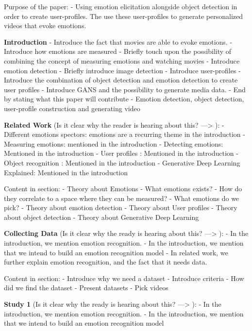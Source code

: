 Purpose of the paper:
    - Using emotion elicitation alongside object detection in order to create user-profiles. The use these user-profiles to generate personalized videos that evoke emotions. 

\textbf{Introduction}
 - Introduce the fact that movies are able to evoke emotions.
 - Introduce how emotions are measured
 - Briefly touch upon the possibility of combining the concept of measuring emotions and watching movies
 - Introduce emotion detection
 - Briefly introduce image detection
 - Introduce user-profiles
 - Introduce the combination of object detection and emotion detection to create user profiles
 - Introduce GANS and the possibility to generate media data.
 - End by stating what this paper will contribute
    - Emotion detection, object detection, user-profile construction and generating video

\textbf{Related Work}
(Is it clear why the reader is hearing about this? ---> ):
    - Different emotions spectors: emotions are a recurring theme in the introduction
    - Measuring emotions: mentioned in the introduction
    - Detecting emotions: Mentioned in the introduction
    - User profiles : Mentioned in the introduction
    - Object recognition : Mentioned in the introduction
    - Generative Deep Learning Explained: Mentioned in the introduction

Content in section:
- Theory about Emotions
    - What emotions exists?
    - How do they correlate to a space where they can be measured?
    - What emotions do we pick?
- Theory about emotion detection
- Theory about User profiles
- Theory about object detection
- Theory about Generative Deep Learning

\textbf{Collecting Data}
(Is it clear why the ready is hearing about this? ---> ):
    - In the introduction, we mention emotion recognition.
    - In the introduction, we mention that we intend to build an emotion recognition model
    - In related work, we further explain emotion recognition, and the fact that it needs data.

Content in section:
- Introduce why we need a dataset
- Introduce criteria 
- How did we find the dataset
- Present datasets 
- Pick videos

\textbf{Study 1}
(Is it clear why the ready is hearing about this? ---> ):
    - In the introduction, we mention emotion recognition.
    - In the introduction, we mention that we intend to build an emotion recognition model

